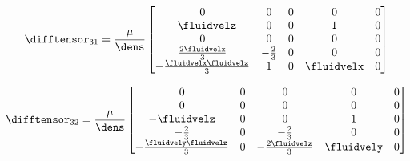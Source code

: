 \documentclass[../main.tex]{subfiles}
\begin{document}
\begin{minipage}{0.50\textwidth}
	\def\kto{ -\fluidvelz }
	\def\kao{ \frac{2\fluidvelx}{3} }
	\def\kso{ -\frac{\fluidvelx\fluidvelz}{3} }
	\def\kat{ -\frac{2}{3} }
	\def\kst{ -\frac{2\fluidvelz}{3} }
	\def\kst{ 1 }
	\def\ksa{ \fluidvelx }
	\begin{align}\nonumber
		\difftensor_{31}=\frac{\mu}{\dens}
		\begin{bmatrix}
		  0     &    0     &    0     &    0     &    0     \\ %
		  \kto  &    0     &    0     &    \kst  &    0     \\ %
		  0     &    0     &    0     &    0     &    0     \\ %
		  \kao  &    \kat  &    0     &    0     &    0     \\ %
		  \kso  &    \kst  &    0     &    \ksa  &    0     \\ %
		\end{bmatrix}
	\end{align}
\end{minipage}
\begin{minipage}{0.50\textwidth}
	\def\keo{ -\fluidvelz }
	\def\kao{ \frac{2\fluidvely}{3} }
	\def\kso{ -\frac{\fluidvely\fluidvelz}{3} }
	\def\kao{ -\frac{2}{3} }
	\def\kse{ -\frac{2\fluidvelz}{3} }
	\def\kea{ 1 }
	\def\ksa{ \fluidvely }
	\begin{align}\nonumber
		\difftensor_{32}=\frac{\mu}{\dens}
		\begin{bmatrix}
		  0     &    0     &    0     &    0     &    0     \\ %
		  0     &    0     &    0     &    0     &    0     \\ %
		  \keo  &    0     &    0     &    \kea  &    0     \\ %
		  \kao  &    0     &    \kao  &    0     &    0     \\ %
		  \kso  &    0     &    \kse  &    \ksa  &    0     \\ %
		\end{bmatrix}
	\end{align}
\end{minipage}
\end{document}
